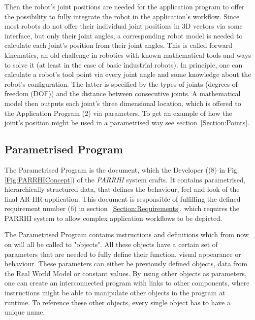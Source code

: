 Then the robot's joint positions are needed for the application program to offer the possibility to fully integrate the robot in the application's workflow. Since most robots do not offer their individual joint positions in 3D vectors via some interface, but only their joint angles, a corresponding robot model is needed to calculate each joint's position from their joint angles. This is called forward kinematics, an old challenge in robotics with known mathematical tools and ways to solve it (at least in the case of basic industrial robots). In principle, one can calculate a robot's tool point via every joint angle and some knowledge about the robot's configuration. The latter is specified by the types of joints (degrees of freedom (DOF)) and the distance between consecutive joints. A mathematical model then outputs each joint's three dimensional location, which is offered to the Application Program (2) via parameters. To get an example of how the joint's position might be used in a parametrised way see section~\ref{Section:Points}.

\subsection{Parametrised Program}
\label{Section:ParametrisedProgram}
The Parametrised Program is the document, which the Developer ((8) in Fig. \ref{Fig:PARRHIConcept}) of the \textit{PARRHI} system crafts. It contains parametrised, hierarchically structured data, that defines the behaviour, feel and look of the final AR-HR-application. This document is responsible of fulfilling the defined requirement number (6) in section~\ref{Section:Requirements}, which requires the PARRHI system to allow complex application workflows to be depicted.


The Parametrised Program contains instructions and definitions which from now on will all be called to "objects". All these objects have a certain set of parameters that are needed to fully define their function, visual appearance or behaviour. These parameters can either be previously defined objects, data from the Real World Model or constant values. By using other objects as parameters, one can create an interconnected program with links to other components, where instructions might be able to manipulate other objects in the program at runtime. To reference these other objects, every single object has to have a unique name.

